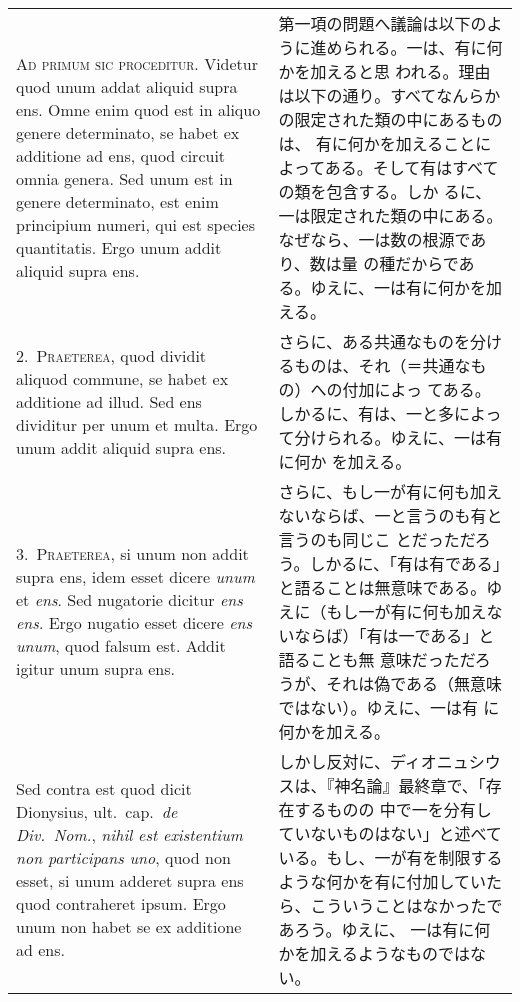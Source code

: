 \documentclass[10pt]{jsarticle} %
\begin{document}
\begin{longtable}{p{21em}p{21em}}
{\huge A}{\scshape d primum sic proceditur}. Videtur quod unum addat aliquid supra
ens. Omne enim quod est in aliquo genere determinato, se habet ex
additione ad ens, quod circuit omnia genera. Sed unum est in genere
determinato, est enim principium numeri, qui est species
quantitatis. Ergo unum addit aliquid supra ens.

&

第一項の問題へ議論は以下のように進められる。一は、有に何かを加えると思
われる。理由は以下の通り。すべてなんらかの限定された類の中にあるものは、
有に何かを加えることによってある。そして有はすべての類を包含する。しか
るに、一は限定された類の中にある。なぜなら、一は数の根源であり、数は量
の種だからである。ゆえに、一は有に何かを加える。

\\

2.~{\scshape Praeterea}, quod dividit aliquod commune, se habet ex additione ad
illud. Sed ens dividitur per unum et multa. Ergo unum addit aliquid
supra ens.

& 

さらに、ある共通なものを分けるものは、それ（＝共通なもの）への付加によっ
てある。しかるに、有は、一と多によって分けられる。ゆえに、一は有に何か
を加える。

\\

3.~{\scshape Praeterea}, si unum non addit supra ens, idem esset dicere
{\itshape unum} et {\itshape ens}. Sed nugatorie dicitur {\itshape ens
ens}. Ergo nugatio esset dicere {\itshape ens unum}, quod falsum
est. Addit igitur unum supra ens.

&

さらに、もし一が有に何も加えないならば、一と言うのも有と言うのも同じこ
とだっただろう。しかるに、「有は有である」と語ることは無意味である。ゆ
 えに（もし一が有に何も加えないならば）「有は一である」と語ることも無
 意味だっただろうが、それは偽である（無意味ではない）。ゆえに、一は有
に何かを加える。

\\

{\sc Sed contra est} quod dicit Dionysius, ult.~cap.~{\it de Div.~Nom.}, {\it nihil est
existentium non participans uno}, quod non esset, si unum adderet supra
ens quod contraheret ipsum. Ergo unum non habet se ex additione ad ens.

&

しかし反対に、ディオニュシウスは、『神名論』最終章で、「存在するものの
中で一を分有していないものはない」と述べている。もし、一が有を制限する
ような何かを有に付加していたら、こういうことはなかったであろう。ゆえに、
一は有に何かを加えるようなものではない。


\end{longtable}
\end{document}
